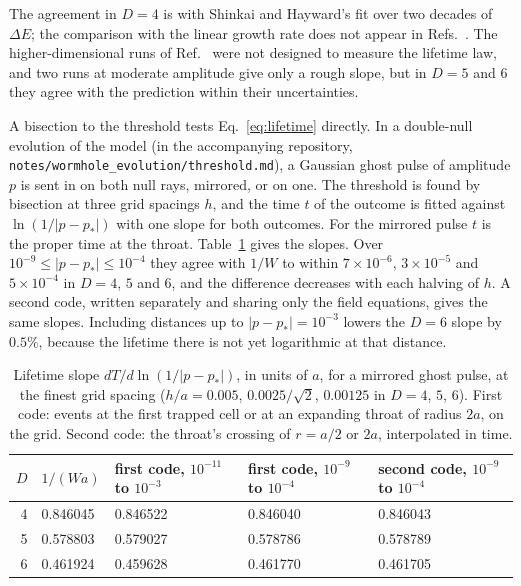\documentclass[11pt]{article}
\theoremstyle{remark}
\begin{document}
The agreement in $D=4$ is with Shinkai and Hayward's fit over two decades of $\Delta E$; the comparison with the
linear growth rate does not appear in Refs.~\cite{SH2002,GGS2009a}. The higher-dimensional runs of Ref.~\cite{ST2017} were not designed to measure the lifetime
law, and two runs at moderate amplitude give only a rough slope, but in $D=5$ and $6$ they agree with the prediction
within their uncertainties.

A bisection to the threshold tests Eq.~\eqref{eq:lifetime} directly. In a double-null evolution of the model (in the
accompanying repository, \texttt{notes/wormhole\_evolution/threshold.md}), a Gaussian ghost pulse of amplitude $p$ is
sent in on both null rays, mirrored, or on one. The threshold is found by bisection at three grid spacings $h$, and the
time $t$ of the outcome is fitted against $\ln(1/|p-p_*|)$ with one slope for both outcomes. For the mirrored pulse $t$
is the proper time at the throat. Table~\ref{tab:bisect} gives the slopes. Over $10^{-9}\le|p-p_*|\le10^{-4}$ they
agree with $1/W$ to within $7\times10^{-6}$, $3\times10^{-5}$ and $5\times10^{-4}$ in $D=4$, $5$ and $6$, and the
difference decreases with each halving of $h$. A second code, written separately and sharing only the field equations, gives the same
slopes. Including distances up to $|p-p_*|=10^{-3}$ lowers the $D=6$ slope by $0.5\%$, because the lifetime there is
not yet logarithmic at that distance.

\begin{table}[t]
\centering
\caption{Lifetime slope $dT/d\ln(1/|p-p_*|)$, in units of $a$, for a mirrored ghost pulse, at the finest grid spacing
($h/a=0.005$, $0.0025/\sqrt2$, $0.00125$ in $D=4$, $5$, $6$). First code: events at the first trapped cell or at an
expanding throat of radius $2a$, on the grid. Second code: the throat's crossing of $r=a/2$ or $2a$, interpolated in
time.}
\label{tab:bisect}
\begin{tabular}{rllll}
\toprule
$D$ & $1/(Wa)$ & first code, $10^{-11}$ to $10^{-3}$ & first code, $10^{-9}$ to $10^{-4}$ & second code, $10^{-9}$ to $10^{-4}$ \\
\midrule
4 & 0.846045 & 0.846522 & 0.846040 & 0.846043 \\
5 & 0.578803 & 0.579027 & 0.578786 & 0.578789 \\
6 & 0.461924 & 0.459628 & 0.461770 & 0.461705 \\
\bottomrule
\end{tabular}
\end{table}
\end{document}
